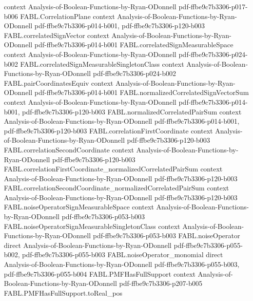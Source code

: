 \begin{theorem}
  {context}
  {Analysis-of-Boolean-Functions-by-Ryan-ODonnell}
  {pdf-ffbe9c7b3306-p017-b006}
\proofstep
  {FABL.CorrelationPlane}
  {context}
  {Analysis-of-Boolean-Functions-by-Ryan-ODonnell}
  {pdf-ffbe9c7b3306-p014-b001,
    pdf-ffbe9c7b3306-p120-b003}
\proofstep
  {FABL.correlatedSignVector}
  {context}
  {Analysis-of-Boolean-Functions-by-Ryan-ODonnell}
  {pdf-ffbe9c7b3306-p014-b001}
\proofstep
  {FABL.correlatedSignMeasurableSpace}
  {context}
  {Analysis-of-Boolean-Functions-by-Ryan-ODonnell}
  {pdf-ffbe9c7b3306-p024-b002}
\proofstep
  {FABL.correlatedSignMeasurableSingletonClass}
  {context}
  {Analysis-of-Boolean-Functions-by-Ryan-ODonnell}
  {pdf-ffbe9c7b3306-p024-b002}
\proofstep
  {FABL.pairCoordinatesEquiv}
  {context}
  {Analysis-of-Boolean-Functions-by-Ryan-ODonnell}
  {pdf-ffbe9c7b3306-p014-b001}
\proofstep
  {FABL.normalizedCorrelatedSignVectorSum}
  {context}
  {Analysis-of-Boolean-Functions-by-Ryan-ODonnell}
  {pdf-ffbe9c7b3306-p014-b001,
    pdf-ffbe9c7b3306-p120-b003}
\proofstep
  {FABL.normalizedCorrelatedPairSum}
  {context}
  {Analysis-of-Boolean-Functions-by-Ryan-ODonnell}
  {pdf-ffbe9c7b3306-p014-b001,
    pdf-ffbe9c7b3306-p120-b003}
\proofstep
  {FABL.correlationFirstCoordinate}
  {context}
  {Analysis-of-Boolean-Functions-by-Ryan-ODonnell}
  {pdf-ffbe9c7b3306-p120-b003}
\proofstep
  {FABL.correlationSecondCoordinate}
  {context}
  {Analysis-of-Boolean-Functions-by-Ryan-ODonnell}
  {pdf-ffbe9c7b3306-p120-b003}
\proofstep
  {FABL.correlationFirstCoordinate_normalizedCorrelatedPairSum}
  {context}
  {Analysis-of-Boolean-Functions-by-Ryan-ODonnell}
  {pdf-ffbe9c7b3306-p120-b003}
\proofstep
  {FABL.correlationSecondCoordinate_normalizedCorrelatedPairSum}
  {context}
  {Analysis-of-Boolean-Functions-by-Ryan-ODonnell}
  {pdf-ffbe9c7b3306-p120-b003}
\proofstep
  {FABL.noiseOperatorSignMeasurableSpace}
  {context}
  {Analysis-of-Boolean-Functions-by-Ryan-ODonnell}
  {pdf-ffbe9c7b3306-p053-b003}
\proofstep
  {FABL.noiseOperatorSignMeasurableSingletonClass}
  {context}
  {Analysis-of-Boolean-Functions-by-Ryan-ODonnell}
  {pdf-ffbe9c7b3306-p053-b003}
\proofstep
  {FABL.noiseOperator}
  {direct}
  {Analysis-of-Boolean-Functions-by-Ryan-ODonnell}
  {pdf-ffbe9c7b3306-p055-b002,
    pdf-ffbe9c7b3306-p055-b003}
\proofstep
  {FABL.noiseOperator_monomial}
  {direct}
  {Analysis-of-Boolean-Functions-by-Ryan-ODonnell}
  {pdf-ffbe9c7b3306-p055-b003,
    pdf-ffbe9c7b3306-p055-b004}
\proofstep
  {FABL.PMFHasFullSupport}
  {context}
  {Analysis-of-Boolean-Functions-by-Ryan-ODonnell}
  {pdf-ffbe9c7b3306-p207-b005}
\proofstep
  {FABL.PMFHasFullSupport.toReal_pos}

\end{theorem}
